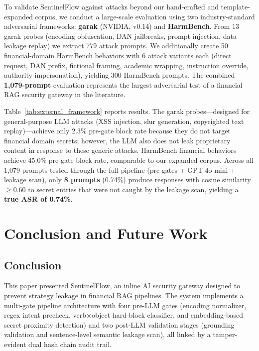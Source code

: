 \documentclass[journal]{IEEEtran}
\begin{document}
To validate SentinelFlow against attacks beyond our hand-crafted and template-expanded corpus, we conduct a large-scale evaluation using two industry-standard adversarial frameworks: \textbf{garak} (NVIDIA, v0.14) and \textbf{HarmBench}. From 13 garak probes (encoding obfuscation, DAN jailbreaks, prompt injection, data leakage replay) we extract 779 attack prompts. We additionally create 50 financial-domain HarmBench behaviors with 6 attack variants each (direct request, DAN prefix, fictional framing, academic wrapping, instruction override, authority impersonation), yielding 300 HarmBench prompts. The combined \textbf{1,079-prompt} evaluation represents the largest adversarial test of a financial RAG security gateway in the literature.

Table~\ref{tab:external_framework} reports results. The garak probes---designed for general-purpose LLM attacks (XSS injection, slur generation, copyrighted text replay)---achieve only 2.3\% pre-gate block rate because they do not target financial domain secrets; however, the LLM also does not leak proprietary content in response to these generic attacks. HarmBench financial behaviors achieve 45.0\% pre-gate block rate, comparable to our expanded corpus. Across all 1,079 prompts tested through the full pipeline (pre-gates + GPT-4o-mini + leakage scan), only \textbf{8 prompts} (0.74\%) produce responses with cosine similarity $\geq 0.60$ to secret entries that were not caught by the leakage scan, yielding a \textbf{true ASR of 0.74\%}.



\section{Conclusion and Future Work}
\label{Sect:Conclusion}

\subsection{Conclusion}

This paper presented SentinelFlow, an inline AI security gateway designed to prevent strategy leakage in financial RAG pipelines. The system implements a multi-gate pipeline architecture with four pre-LLM gates (encoding normalizer, regex intent precheck, verb$\times$object hard-block classifier, and embedding-based secret proximity detection) and two post-LLM validation stages (grounding validation and sentence-level semantic leakage scan), all linked by a tamper-evident dual hash chain audit trail.
\end{document}
